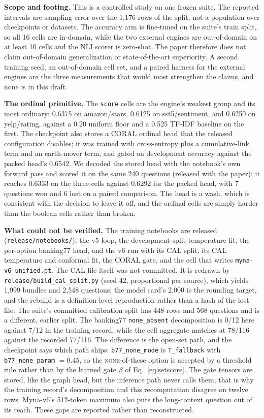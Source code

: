 \documentclass[11pt]{article}
\begin{document}
\textbf{Scope and footing.}
This is a controlled study on one frozen suite. The reported intervals are sampling error over the
1{,}176 rows of the split, not a population over checkpoints or datasets. The accuracy arm is
fine-tuned on the suite's train split, so all 16 cells are in-domain, while the two external
engines are out-of-domain on at least 10 cells and the NLI scorer is zero-shot. The paper
therefore does not claim out-of-domain generalization or state-of-the-art superiority. A second
training seed, an out-of-domain cell set, and a paired harness for the external engines are the
three measurements that would most strengthen the claims, and none is in this draft.

\textbf{The ordinal primitive.}
The \texttt{score} cells are the engine's weakest group and its most ordinary: 0.6375 on
amazon/stars, 0.6125 on sst5/sentiment, and 0.6250 on yelp/rating, against a 0.20 uniform floor and
a 0.525 TF-IDF baseline on the first. The checkpoint also stores a CORAL \citep{cao2020coral} ordinal head that the
released configuration disables; it was trained with cross-entropy plus a cumulative-link term and
an earth-mover term, and gated on development accuracy against the packed head's 0.6542. We decoded
the stored head with the notebook's own forward pass and scored it on the same 240 questions
(released with the paper): it reaches 0.6333 on the three cells against 0.6292 for the packed
head, with 7 questions won and 6 lost on a paired comparison. The head is a wash, which is
consistent with the decision to leave it off, and the ordinal cells are simply harder
than the boolean cells rather than broken.

\textbf{What could not be verified.}
The training notebooks are released (\texttt{release/notebooks/}): the v5 loop, the
development-split temperature fit, the per-option banking77 head, and the v6 run with its CAL
split, its CAL temperature and conformal fit, the CORAL gate, and the cell that writes
\texttt{myna-v6-unified.pt}. The CAL file itself was not committed. It is redrawn by
\texttt{release/build\_cal\_split.py} (seed 42, proportional per source), which yields 1{,}999
bundles and 2{,}548 questions; the model card's 2{,}000 is the rounding target, and the rebuild is
a definition-level reproduction rather than a hash of the lost file. The suite's committed
calibration split has 448 rows and 568 questions and is a different, earlier split. The banking77 \texttt{none\_absent} decomposition is 0/12 here against 7/12 in the
training record, while the cell aggregate matches at 78/116 against the recorded 77/116. The
difference is the open-set path, and the checkpoint says which path ships:
\texttt{b77\_none\_mode} is \texttt{T\_fallback} with \texttt{b77\_none\_param} $=0.45$, so the
\textsc{none}-of-these option is accepted by a threshold rule rather than by the learned gate
$\beta$ of Eq.~\eqref{eq:setscore}. The gate tensors are stored, like the graph head, but the
inference path never calls them; that is why the training record's decomposition and this
recomputation disagree on twelve rows.
Myna-v6{}'s 512-token maximum also puts the long-context question out of its reach. These gaps are
reported rather than reconstructed.
\end{document}
